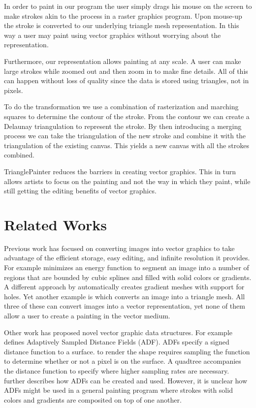 \documentclass[conference]{acmsiggraph}
\begin{document}
In order to paint in our program the user simply drags his mouse on the screen to make
strokes akin to the process in a raster graphics program. Upon mouse-up the stroke is
converted to our underlying triangle mesh representation. In this way a user may paint using
vector graphics without worrying about the representation.

Furthermore, our representation allows painting at any scale. A user can make large strokes
while zoomed out and then zoom in to make fine details. All of this can happen without
loss of quality since the data is stored using triangles, not in pixels.

To do the transformation we use a combination of rasterization and marching squares to
determine the contour of the stroke. From the contour we can create a Delaunay triangulation
to represent the stroke. By then introducing a merging process we can take the triangulation
of the new stroke and combine it with the triangulation of the existing canvas. This yields
a new canvas with all the strokes combined.

TrianglePainter reduces the barriers in creating vector graphics. This in turn allows 
artists to focus on the painting and not the way in which they paint, while still 
getting the editing benefits of vector graphics.

\section{Related Works}

Previous work has focused on converting images into vector graphics to take advantage of the
efficient storage, easy editing, and infinite resolution it provides. For example \cite{lecot:ARD:2006}
minimizes an energy function to segment an image into a number of regions that are bounded
by cubic splines and filled with solid colors or gradients. A different approach by \cite{Lai:2009:ATG:1531326.1531391} 
automatically creates gradient meshes with support for holes. Yet another example is \cite{10.1109/TVCG.2012.76} 
which converts an image into a triangle mesh. All three of these can convert images into
a vector representation, yet none of them allow a user to create a painting in the vector medium.

Other work has proposed novel vector graphic data structures. For example \cite{Frisken:2000:ASD:344779.344899}
defines Adaptively Sampled Distance Fields (ADF). ADFs specify a signed distance function to a surface.
to render the shape requires sampling the function to determine whether or not a pixel is on the surface.
A quadtree accompanies the distance function to specify where higher sampling rates are necessary. \cite{Bremer:2001:VCM}
further describes how ADFs can be created and used. However, it is unclear how ADFs might be used in a general
painting program where strokes with solid colors and gradients are composited on top of one another.
\end{document}
